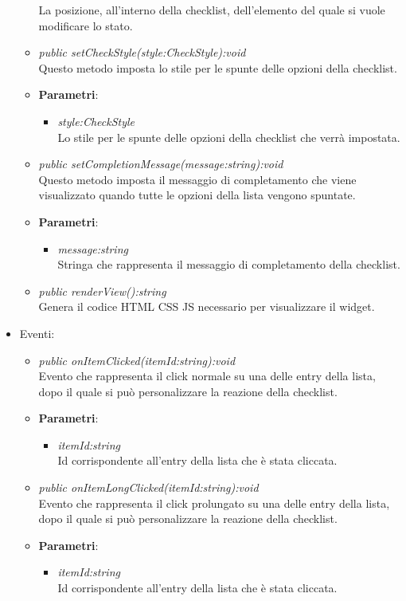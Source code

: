 \begin{itemize}
\begin{itemize}
{\begin{itemize}
		La posizione, all'interno della checklist, dell'elemento del quale si vuole modificare lo stato. 
		\end{itemize}} 
	\item \textit{public setCheckStyle(style:CheckStyle):void}\\
	Questo metodo imposta lo stile per le spunte delle opzioni della checklist.
		\item{\textbf{Parametri}: \begin{itemize}
		\item \textit{style:CheckStyle}\\
		Lo stile per le spunte delle opzioni della checklist che verrà impostata.
		\end{itemize}} 
	\item \textit{public setCompletionMessage(message:string):void}\\
	Questo metodo imposta il messaggio di completamento che viene visualizzato quando tutte le opzioni della lista vengono spuntate.
		\item{\textbf{Parametri}: \begin{itemize}
		\item \textit{message:string}\\
		Stringa che rappresenta il messaggio di completamento della checklist.
		\end{itemize}}
	\item \textit{public renderView():string}\\
	Genera il codice HTML CSS JS necessario per visualizzare il widget.
	\end{itemize}
\item{Eventi}:
	\begin{itemize}
	\item \textit{public onItemClicked(itemId:string):void}\\
	Evento che rappresenta il click normale su una delle entry della lista, dopo il quale si può personalizzare la reazione della checklist.
		\item{\textbf{Parametri}: \begin{itemize}
		\item \textit{itemId:string}\\
		Id corrispondente all'entry della lista che è stata cliccata.
		\end{itemize}}
	\item \textit{public onItemLongClicked(itemId:string):void}\\
	Evento che rappresenta il click prolungato su una delle entry della lista, dopo il quale si può personalizzare la reazione della checklist.
		\item{\textbf{Parametri}: \begin{itemize}
		\item \textit{itemId:string}\\
		Id corrispondente all'entry della lista che è stata cliccata.
		\end{itemize}}
	\end{itemize}
\end{itemize}


